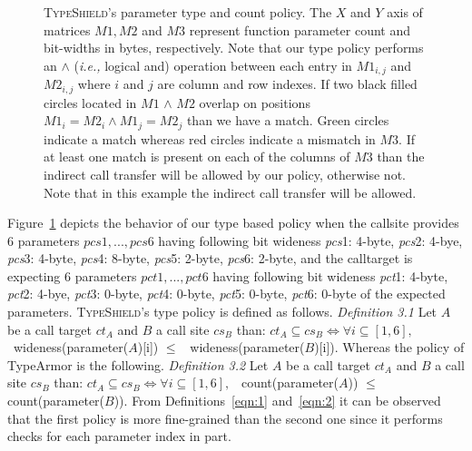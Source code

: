 \begin{figure}[H]
{\begin{tikzpicture}[shorten >=1pt,node distance=2cm,on grid,auto]
\end{tikzpicture}}
\caption{\textsc{TypeShield}'s parameter type and count policy. 
The $X$ and $Y$ axis of matrices $M1, M2$ and $M3$ represent function parameter count 
and bit-widths in bytes, respectively.
Note that our type policy performs an $\wedge$ (\textit{i.e.,} logical and) operation
between each entry in $M1_{i,j}$ and $M2_{i,j}$ where $i$ and $j$ are column and row indexes. 
If two black filled circles located in $M1$ $\wedge$ $M2$ overlap on positions $M1_{i} = M2_{i} \wedge M1_{j} = M2_{j}$ than we have a match.
Green circles indicate a match whereas red circles indicate a mismatch in $M3$.
If at least one match is present on each of the columns of 
$M3$ than the indirect call transfer will be allowed by our policy, 
otherwise not. Note that in this example
the indirect call transfer will be allowed.}
\label{Type and parameter count policy.}
\end{figure}

Figure~\ref{Type and parameter count policy.} depicts the behavior of our type based policy
when the callsite provides 6 parameters $pcs1, ..., pcs6$ having following bit 
wideness \textit{pcs}1: 4-byte, \textit{pcs}2: 4-bye, \textit{pcs}3: 4-byte, \textit{pcs}4: 8-byte, \textit{pcs}5: 2-byte, 
\textit{pcs}6: 2-byte, and the calltarget is expecting 6 parameters $pct1, ..., pct6$ having following bit 
wideness \textit{pct}1: 4-byte, \textit{pct}2: 4-bye, \textit{pct}3: 0-byte, \textit{pct}4: 0-byte, \textit{pct}5: 0-byte, 
\textit{pct}6: 0-byte of the expected parameters. 
\textsc{TypeShield}'s type policy is defined as follows. 
\label{eqn:1}{
\textit{Definition 3.1} Let $A$ be a call target $ct_{A}$ and $B$ a call site $cs_{B}$ than: 
$ct_{A} \subseteq cs_{B} \iff \forall i \subseteq [1, 6],$
\ wideness(parameter($A$)[i]) $\leq$ \ wideness(parameter($B$)[i]).
}
Whereas the policy of TypeArmor is the following. 
\label{eqn:2}{
\textit{Definition 3.2} Let $A$ be a call target $ct_{A}$ and $B$ a call site $cs_{B}$ than: 
$ct_{A} \subseteq cs_{B} \iff \forall i \subseteq [1, 6],$ 
\ count(parameter($A$)) $\leq$ count(parameter($B$)).
}
From Definitions~\eqref{eqn:1} and~\eqref{eqn:2} it can be observed that 
the first policy is more fine-grained than the second one since it performs checks 
for each parameter index in part.

